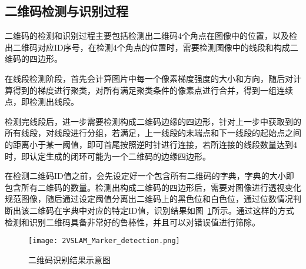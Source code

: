 \subsection{二维码检测与识别过程}
\label{sec:2.2.1}
二维码的检测和识别过程主要包括检测出二维码4个角点在图像中的位置，以及检出二维码对应ID序号，在检测4个角点的位置时，需要检测图像中的线段和构成二维码的四边形。

在线段检测阶段，首先会计算图片中每一个像素梯度强度的大小和方向，随后对计算得到的梯度进行聚类，对所有满足聚类条件的像素点进行合并，得到一组连续点，即检测出线段。

检测完线段后，进一步需要检测构成二维码边缘的四边形，针对上一步中获取到的所有线段，对线段进行分组，若满足，上一线段的末端点和下一线段的起始点之间的距离小于某一阈值，即可首尾按照逆时针进行连接，若所连接的线段数量达到4时，即认定生成的闭环可能为一个二维码的边缘四边形。

在检测二维码ID值之前，会先设定好一个包含所有二维码的字典，字典的大小即包含所有二维码的数量。检测出构成二维码的四边形后，需要对图像进行透视变化规范图像，随后通过设定阈值分离出二维码上的黑色位和白色位，通过位数情况判断出该二维码在字典中对应的特定ID值，识别结果如图~\ref{fig:2VSLAM_Marker_detection}所示。通过这样的方式检测和识别二维码具备非常好的鲁棒性，并且可以对错误值进行筛除。
\begin{figure}[H] %
  \centering
  \texttt{[image: 2VSLAM\_Marker\_detection.png]}
  \caption{二维码识别结果示意图}
  \label{fig:2VSLAM_Marker_detection}
\end{figure} 


